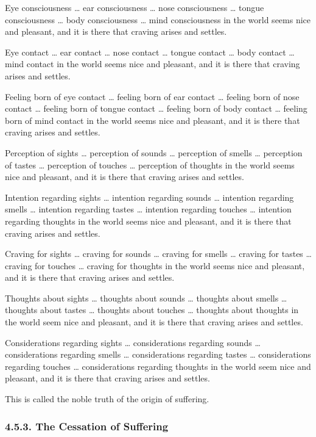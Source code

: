 \documentclass[12pt,openany]{book}%
\begin{document}
Eye consciousness … ear consciousness … nose consciousness … tongue consciousness … body consciousness … mind consciousness in the world seems nice and pleasant, and it is there that craving arises and settles. 

Eye contact … ear contact … nose contact … tongue contact … body contact … mind contact in the world seems nice and pleasant, and it is there that craving arises and settles. 

Feeling born of eye contact … feeling born of ear contact … feeling born of nose contact … feeling born of tongue contact … feeling born of body contact … feeling born of mind contact in the world seems nice and pleasant, and it is there that craving arises and settles. 

Perception of sights … perception of sounds … perception of smells … perception of tastes … perception of touches … perception of thoughts in the world seems nice and pleasant, and it is there that craving arises and settles. 

Intention regarding sights … intention regarding sounds … intention regarding smells … intention regarding tastes … intention regarding touches … intention regarding thoughts in the world seems nice and pleasant, and it is there that craving arises and settles. 

Craving for sights … craving for sounds … craving for smells … craving for tastes … craving for touches … craving for thoughts in the world seems nice and pleasant, and it is there that craving arises and settles. 

Thoughts about sights … thoughts about sounds … thoughts about smells … thoughts about tastes … thoughts about touches … thoughts about thoughts in the world seem nice and pleasant, and it is there that craving arises and settles. 

Considerations regarding sights … considerations regarding sounds … considerations regarding smells … considerations regarding tastes … considerations regarding touches … considerations regarding thoughts in the world seem nice and pleasant, and it is there that craving arises and settles. 

This is called the noble truth of the origin of suffering. 

\subsubsection*{4.5.3. The Cessation of Suffering }
\end{document}
